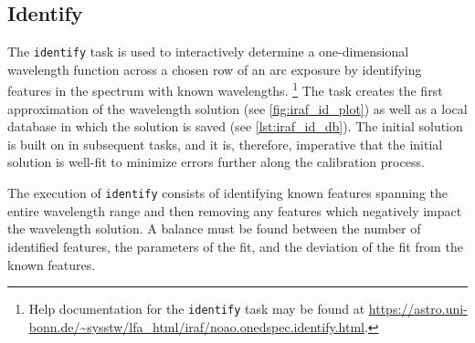 \subsection{Identify} \label{subsec:iraf_identify}

The \texttt{identify} task is used to interactively determine a one-dimensional wavelength function across a chosen row of an arc exposure by identifying features in the spectrum with known wavelengths.%
\footnote{Help documentation for the \texttt{identify} task may be found at \url{https://astro.uni-bonn.de/~sysstw/lfa_html/iraf/noao.onedspec.identify.html}.}
The task creates the first approximation of the wavelength solution (see \autoref{fig:iraf_id_plot}) as well as a local database in which the solution is saved (see \autoref{lst:iraf_id_db}). The initial solution is built on in subsequent tasks, and it is, therefore, imperative that the initial solution is well-fit to minimize errors further along the calibration process.

The execution of \texttt{identify} consists of identifying known features spanning the entire wavelength range and then removing any features which negatively impact the wavelength solution. A balance must be found between the number of identified features, the parameters of the fit, and the deviation of the fit from the known features.

